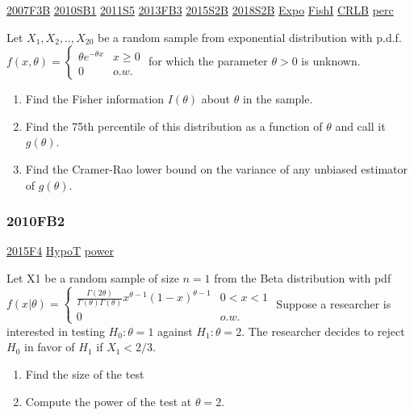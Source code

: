 \documentclass[10pt,twocolumn,portrait]{article}
\begin{document}
\protect\hyperlink{f3b}{2007F3B} \protect\hyperlink{sb1-1}{2010SB1}
\protect\hyperlink{s5-2}{2011S5} \protect\hyperlink{fb3-2}{2013FB3}
\protect\hyperlink{s2b-1}{2015S2B} \protect\hyperlink{s2b-2}{2018S2B}
\protect\hyperlink{Expo}{Expo} \protect\hyperlink{section-5}{FishI}
\protect\hyperlink{section-5}{CRLB} \protect\hyperlink{perc}{perc}

Let \(X_1,X_2,..,X_{20}\) be a random sample from exponential
distribution with p.d.f.
\(f(x,\theta)=\begin{cases}\theta e^{-\theta x}& x\ge0\\0& o.w.\end{cases}\)
for which the parameter \(\theta>0\) is unknown.

\begin{enumerate}
\def\labelenumi{(\alph{enumi})}
\item
  Find the Fisher information \(I(\theta)\) about \(\theta\) in the
  sample.
\item
  Find the 75th percentile of this distribution as a function of
  \(\theta\) and call it \(g(\theta)\).
\item
  Find the Cramer-Rao lower bound on the variance of any unbiased
  estimator of \(g(\theta)\).
\end{enumerate}

\hypertarget{fb2-1}{%
\subsubsection{2010FB2}\label{fb2-1}}

\protect\hyperlink{f4-5}{2015F4} \protect\hyperlink{HypoT}{HypoT}
\protect\hyperlink{power}{power}

Let X1 be a random sample of size \(n=1\) from the Beta distribution
with pdf
\(f(x|\theta)=\begin{cases}\frac{\Gamma(2\theta)}{\Gamma(\theta)\Gamma(\theta)}x^{\theta-1}(1-x)^{\theta-1}&0<x<1\\0&o.w.\end{cases}\)
Suppose a researcher is interested in testing \(H_0:\theta=1\) against
\(H_1:\theta=2\). The researcher decides to reject \(H_0\) in favor of
\(H_1\) if \(X_1<2/3\).

\begin{enumerate}
\def\labelenumi{(\alph{enumi})}
\item
  Find the size of the test
\item
  Compute the power of the test at \(\theta=2\).
\end{enumerate}
\end{document}
